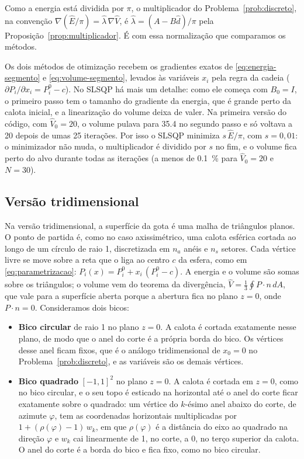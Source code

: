 \documentclass[12pt, oneside, a4paper, english, brazil]{abntex2}
\theoremstyle{relatorio}
\theoremstyle{relatorioit}
\theoremstyle{problema}
\newcommand{\Vh}{\hat V}
\newcommand{\dhat}{\hat d}
\newcommand{\lh}{\hat\lambda}
\newcommand{\Eh}{\hat E}
\begin{document}
Como a energia está dividida por $\pi$, o multiplicador do Problema~\ref{prob:discreto},
na convenção $\nabla(\Eh/\pi) = \lh\, \nabla\Vh$, é $\lh = (A - B\dhat)/\pi$ pela
Proposição~\ref{prop:multiplicador}. É com essa normalização que comparamos os
métodos.

Os dois métodos de otimização recebem os gradientes exatos de
\eqref{eq:energia-segmento} e \eqref{eq:volume-segmento}, levados às variáveis $x_i$
pela regra da cadeia ($\partial P_i/\partial x_i = P_i^0 - c$). No SLSQP há mais um
detalhe: como ele começa com $B_0 = I$, o primeiro passo tem o tamanho do gradiente da
energia, que é grande perto da calota inicial, e a linearização do volume deixa de
valer. Na primeira versão do código, com $\Vh_0 = 20$, o volume pulava para
\num{35.4} no segundo passo e só voltava a 20 depois de umas 25 iterações. Por isso o
SLSQP minimiza $s\,\Eh/\pi$, com $s = 0{,}01$: o minimizador não muda, o multiplicador
é dividido por $s$ no fim, e o volume fica perto do alvo durante todas as iterações
(a menos de \qty{0.1}{\percent} para $\Vh_0 = 20$ e $N = 30$).

\subsection{Versão tridimensional}
\label{sec:modelo-3d}

Na versão tridimensional, a superfície da gota é uma malha de triângulos planos. O
ponto de partida é, como no caso axissimétrico, uma calota esférica cortada ao longo
de um círculo de raio 1, discretizada em $n_a$ anéis e $n_s$ setores. Cada vértice
livre se move sobre a reta que o liga ao centro $c$ da esfera, como em
\eqref{eq:parametrizacao}: $P_i(x) = P_i^0 + x_i\,(P_i^0 - c)$. A energia e o volume
são somas sobre os triângulos; o volume vem do teorema da divergência,
$\Vh = \frac13 \oint P \cdot n\, dA$, que vale para a superfície aberta porque a
abertura fica no plano $z = 0$, onde $P \cdot n = 0$. Consideramos dois bicos:

\begin{itemize}
  \item \textbf{Bico circular} de raio 1 no plano $z = 0$. A calota é cortada
    exatamente nesse plano, de modo que o anel do corte é a própria borda do bico. Os
    vértices desse anel ficam fixos, que é o análogo tridimensional de $x_0 = 0$ no
    Problema~\ref{prob:discreto}, e as variáveis são os demais vértices.
  \item \textbf{Bico quadrado} $[-1, 1]^2$ no plano $z = 0$. A calota é cortada em
    $z = 0$, como no bico circular, e o seu topo é esticado na horizontal até o anel
    do corte ficar exatamente sobre o quadrado: um vértice do $k$-ésimo anel abaixo do
    corte, de azimute $\varphi$, tem as coordenadas horizontais multiplicadas por
    $1 + (\rho(\varphi) - 1)\, w_k$, em que $\rho(\varphi)$ é a distância do eixo ao
    quadrado na direção $\varphi$ e $w_k$ cai linearmente de 1, no corte, a 0, no
    terço superior da calota. O anel do corte é a borda do bico e fica fixo, como no
    bico circular.
\end{itemize}
\end{document}
